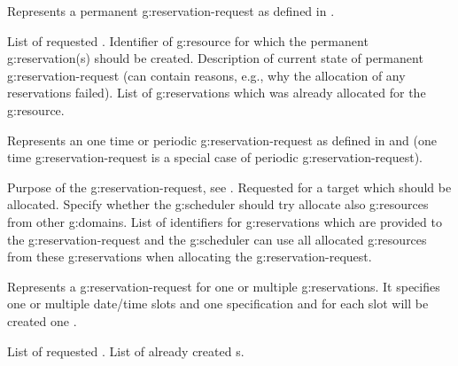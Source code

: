 \begin{Api}
Represents a permanent \gls{g:reservation-request} as defined in .
\begin{ApiClassAttributes}
 List of requested .
 Identifier of \gls{g:resource} for which the permanent \gls{g:reservation}(s) should be created. 
 Description of current state of permanent \gls{g:reservation-request} (can contain reasons, e.g., why the allocation of any reservations failed).
 List of \glspl{g:reservation} which was already allocated for the \gls{g:resource}.
\end{ApiClassAttributes}

Represents an one time or periodic \gls{g:reservation-request} as defined in  and  (one time \gls{g:reservation-request} is a special case of periodic \gls{g:reservation-request}).
\begin{ApiClassAttributes}
 Purpose of the \gls{g:reservation-request}, see .
 Requested  for a target which should be allocated.
 Specify whether the \gls{g:scheduler} should try allocate also \glspl{g:resource} from other \glspl{g:domain}.
 List of identifiers for \glspl{g:reservation} which are provided to the \gls{g:reservation-request} and the \gls{g:scheduler} can use all allocated \glspl{g:resource} from these \glspl{g:reservation} when allocating the \gls{g:reservation-request}.
\end{ApiClassAttributes}

Represents a \gls{g:reservation-request} for one or multiple \glspl{g:reservation}. It specifies one or multiple date/time slots and one specification and for each slot will be created one .
\begin{ApiClassAttributes}
 List of requested .
 List of already created s.
\end{ApiClassAttributes}


\end{Api}
